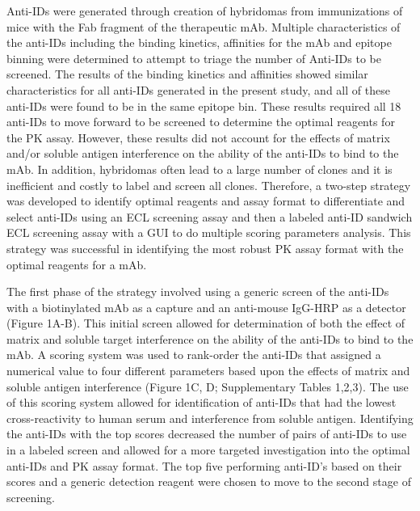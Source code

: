 Anti-IDs were generated through creation of hybridomas from immunizations of mice with the Fab fragment of the therapeutic mAb.  Multiple characteristics of the anti-IDs including the binding kinetics, affinities for the mAb and epitope binning were determined to attempt to triage the number of Anti-IDs to be screened.  The results of the binding kinetics and affinities showed similar characteristics for all anti-IDs generated in the present study, and all of these anti-IDs were found to be in the same epitope bin.   These results required all 18 anti-IDs to move forward to be screened to determine the optimal reagents for the PK assay.  However, these results did not account for the effects of matrix and/or soluble antigen interference on the ability of the anti-IDs to bind to the mAb.  In addition, hybridomas often lead to a large number of clones and it is inefficient and costly to label and screen all clones.  Therefore, a two-step strategy was developed to identify optimal reagents and assay format to differentiate and select anti-IDs using an ECL screening assay and then a labeled anti-ID sandwich ECL screening assay with a GUI to do multiple scoring parameters analysis.  This strategy was successful in identifying the most robust PK assay format with the optimal reagents for a mAb.    

The first phase of the strategy involved using a generic screen of the anti-IDs with a biotinylated mAb as a capture and an anti-mouse IgG-HRP as a detector (Figure 1A-B).  This initial screen allowed for determination of both the effect of matrix and soluble target interference on the ability of the anti-IDs to bind to the mAb.  A scoring system was used to rank-order the anti-IDs that assigned a numerical value to four different parameters based upon the effects of matrix and soluble antigen interference (Figure 1C, D; Supplementary Tables 1,2,3).  The use of this scoring system allowed for identification of anti-IDs that had the lowest cross-reactivity to human serum and interference from soluble antigen.  Identifying the anti-IDs with the top scores decreased the number of pairs of anti-IDs to use in a labeled screen and allowed for a more targeted investigation into the optimal anti-IDs and PK assay format.  The top five performing anti-ID’s based on their scores and a generic detection reagent were chosen to move to the second stage of screening.

